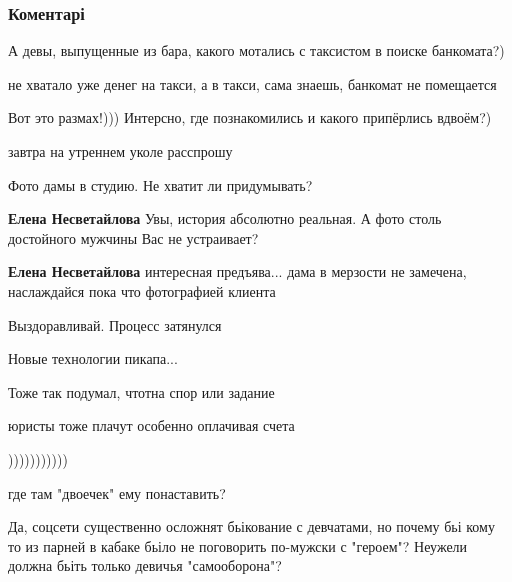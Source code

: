  
 
 
 
 
\subsubsection{Коментарі}
\label{sec:03_08_2018.fb.lesev_igor.1.devchonki_princ.cmt}

\begin{itemize} %
А девы, выпущенные из бара, какого мотались с таксистом в поиске банкомата?)

\begin{itemize} %
не хватало уже денег на такси, а в такси, сама знаешь, банкомат не помещается

Вот это размах!))) Интерсно, где познакомились и какого припёрлись вдвоём?)

завтра на утреннем уколе расспрошу

Фото дамы в студию.
Не хватит ли придумывать?

\textbf{Елена Несветайлова} Увы, история абсолютно реальная. А фото столь достойного мужчины Вас не устраивает?

\textbf{Елена Несветайлова} интересная предъява... дама в мерзости не замечена, наслаждайся пока что фотографией клиента

Выздоравливай. Процесс затянулся
\end{itemize} %

Новые технологии пикапа...

Тоже так подумал, чтотна спор или задание

юристы тоже плачут особенно оплачивая счета

)))))))))))

где там "двоечек" ему понаставить?


Да, соцсети существенно осложнят бьікование с девчатами, но почему бьі кому то
из парней в кабаке бьіло не поговорить по-мужски с "героем"? Неужели должна
бьіть только девичья "самооборона"?


\end{itemize}
